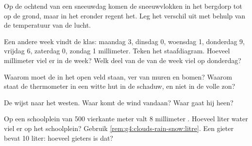 \begin{exercise}[$\star\star$]\label{exo:g4:clouds-rain-snow:7}
Op de ochtend van een sneeuwdag komen de sneeuwvlokken in het bergdorp tot
op de grond, maar in het  eronder regent het. Leg het verschil uit met
behulp van de temperatuur van de lucht.
\end{exercise}

\begin{exercise}[$\star\star$]\label{exo:g4:clouds-rain-snow:8}
Een andere week vindt de klas: maandag 3, dinsdag 0, woensdag 1, donderdag
9, vrijdag 6, zaterdag 0, zondag 1 millimeter. Teken het staafdiagram.
Hoeveel millimeter viel er in de week? Welk deel van de  van de week
viel op donderdag?
\end{exercise}

\begin{exercise}[$\star\star$]\label{exo:g4:clouds-rain-snow:9}
Waarom moet de  in het open veld staan, ver van muren en bomen?
Waarom staat de thermometer in een witte hut in de schaduw, en niet in de
volle zon?
\end{exercise}

\begin{exercise}[$\star\star$]\label{exo:g4:clouds-rain-snow:10}
De  wijst naar het westen. Waar komt de wind vandaan? Waar gaat hij
heen?
\end{exercise}

\begin{exercise}[$\star\star\star$]\label{exo:g4:clouds-rain-snow:11}
Op een schoolplein van 500 vierkante meter valt 8 millimeter . Hoeveel
liter water viel er op het schoolplein? Gebruik
\cref{rem:g4:clouds-rain-snow:litre}. Een gieter bevat 10 liter: hoeveel
gieters is dat?
\end{exercise}
